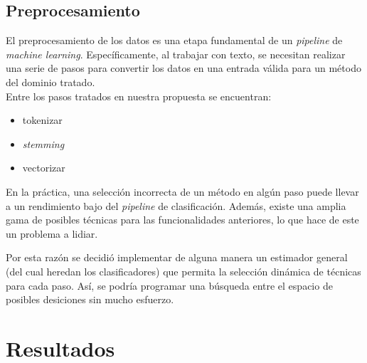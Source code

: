 \documentclass[runningheads,a4paper]{llncs}
\begin{document}
\subsection{Preprocesamiento}
	El preprocesamiento de los datos es una etapa fundamental de un \textit{pipeline} de \textit{machine learning}. Espec\'ificamente, al trabajar con texto, se necesitan realizar una serie de pasos para convertir los datos en una entrada v\'alida para un m\'etodo del dominio tratado.\\
	
	Entre los pasos tratados en nuestra propuesta se encuentran:
	\begin{itemize}
		\item tokenizar
		\item \textit{stemming}
		\item vectorizar
	\end{itemize}

	En la pr\'actica, una selecci\'on incorrecta de un m\'etodo en alg\'un paso puede llevar a un rendimiento bajo del \textit{pipeline} de clasificaci\'on. Adem\'as, existe una amplia gama de posibles t\'ecnicas para las funcionalidades anteriores, lo que hace de este un problema a lidiar.
	
	Por esta raz\'on se decidi\'o implementar de alguna manera un estimador general (del cual heredan los clasificadores) que permita la selecci\'on din\'amica de t\'ecnicas para cada paso. As\'i, se podr\'ia programar una b\'usqueda entre el espacio de posibles desiciones sin mucho esfuerzo.

\section{Resultados}



	
\end{document}
